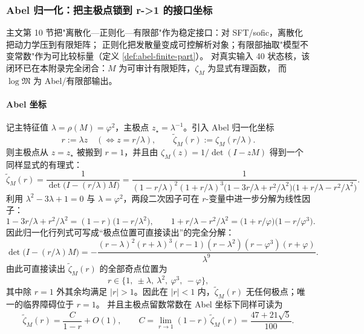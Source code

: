 \subsubsection{Abel 归一化：把主极点锁到 r->1 的接口坐标}\label{app:real-input-40-abel}
主文第 10 节把"离散化—正则化—有限部"作为稳定接口：对 SFT/sofic，离散化把动力学压到有限矩阵；
正则化把发散量变成可控解析对象；有限部抽取"模型不变常数"作为可比较标量（定义 \ref{def:abel-finite-part}）。
对真实输入 40 状态核，该闭环已在本附录完全闭合：$M$ 为可审计有限矩阵，$\zeta_M$ 为显式有理函数，
而 $\log\mathfrak{M}$ 为 Abel/有限部输出。

\paragraph{Abel 坐标}
记主特征值 $\lambda=\rho(M)=\varphi^2$，主极点 $z_\star=\lambda^{-1}$。引入 Abel 归一化坐标
\[
r:=\lambda z\quad(\Leftrightarrow z=r/\lambda),\qquad
\widetilde{\zeta}_M(r):=\zeta_M(r/\lambda).
\]
则主极点从 $z=z_\star$ 被搬到 $r=1$，并且由 $\zeta_M(z)=1/\det(I-zM)$ 得到一个同样显式的有理式：
\[
\widetilde{\zeta}_M(r)
=\frac{1}{\det\!\bigl(I-(r/\lambda)M\bigr)}
=\frac{1}{(1-r/\lambda)^2(1+r/\lambda)^3\bigl(1-3r/\lambda+r^2/\lambda^2\bigr)\bigl(1+r/\lambda-r^2/\lambda^2\bigr)}.
\]
利用 $\lambda^2-3\lambda+1=0$ 与 $\lambda=\varphi^2$，两段二次因子可在 $r$-变量中进一步分解为线性因子：
\[
1-3r/\lambda+r^2/\lambda^2=(1-r)\bigl(1-r/\lambda^2\bigr),\qquad
1+r/\lambda-r^2/\lambda^2=\bigl(1+r/\varphi\bigr)\bigl(1-r/\varphi^3\bigr).
\]
因此归一化行列式可写成“极点位置可直接读出”的完全分解：
\[
\det\!\bigl(I-(r/\lambda)M\bigr)
=-\frac{(r-\lambda)^2(r+\lambda)^3(r-1)(r-\lambda^2)(r-\varphi^3)(r+\varphi)}{\lambda^9}.
\]
由此可直接读出 $\widetilde{\zeta}_M(r)$ 的全部奇点位置为
\[
r\in\{1,\ \pm\lambda,\ \lambda^2,\ \varphi^3,\ -\varphi\},
\]
其中除 $r=1$ 外其余均满足 $|r|>1$。因此在 $|r|<1$ 内，$\widetilde{\zeta}_M(r)$ 无任何极点；唯一的临界障碍位于 $r=1$。
并且主极点留数常数在 Abel 坐标下同样可读为
\[
\widetilde{\zeta}_M(r)=\frac{C}{1-r}+O(1),
\qquad
C=\lim_{r\to 1}(1-r)\,\widetilde{\zeta}_M(r)=\frac{47+21\sqrt5}{100}.
\]
